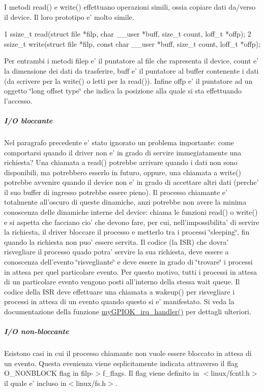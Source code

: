 I metodi read() e write() effettuano operazioni simili, ossia copiare dati da/verso il device. Il loro prototipo e' molto simile. 
\begin{DoxyCode}
1 ssize\_t read(struct file *filp, char \_\_user *buff, size\_t count, loff\_t *offp);
2 ssize\_t write(struct file *filp, const char \_\_user *buff, size\_t count, loff\_t *offp);
\end{DoxyCode}
 Per entrambi i metodi filep e' il puntatore al file che rapresenta il device, count e' la dimensione dei dati da trasferire, buff e' il puntatore al buffer contenente i dati (da scrivere per la write() o letti per la read()). Infine offp e' il puntatore ad un oggetto \char`\"{}long offset type\char`\"{} che indica la posizione alla quale si sta effettuando l'accesso.

\subparagraph*{I/\+O bloccante}

Nel paragrafo precedente e' stato ignorato un problema importante\+: come comportarsi quando il driver non e' in grado di servire immegiatamente una richiesta? Una chiamata a read() potrebbe arrivare quando i dati non sono disponibili, ma potrebbero esserlo in futuro, oppure, una chiamata a write() potrebbe avvenire quando il device non e' in grado di accettare altri dati (perche' il suo buffer di ingresso potrebbe essere pieno). Il processo chiamante e' totalmente all'oscuro di queste dinamiche, anzi potrebbe non avere la minima conoscenza delle dinamiche interne del device\+: chiama le funzioni read() o write() e si aspetta che facciano cio' che devono fare, per cui, nell'impossibilita' di servire la richiesta, il driver bloccare il processo e metterlo tra i processi \char`\"{}sleeping\char`\"{}, fin quando la richiesta non puo' essere servita. Il codice (la I\+S\+R) che dovra' risvegliare il processo quado potra' servire la sua richiesta, deve essere a conoscenza dell'evento \char`\"{}risvegliante\char`\"{} e deve essere in grado di \char`\"{}trovare\char`\"{} i processi in attesa per quel particolare evento. Per questo motivo, tutti i processi in attesa di un particolare evento vengono posti all'interno della stessa wait queue. Il codice della I\+S\+R deve effettuare una chiamata a wakeup() per risvegliare i processi in attesa di un evento quando questo si e' manifestato. Si veda la documentazione della funzione \hyperlink{group___kernel-_module_ga2fc230a12a97aa63e43b2dc4aec73511}{my\+G\+P\+I\+O\+K\+\_\+irq\+\_\+handler()} per dettagli ulteriori. \subparagraph*{I/\+O non-\/bloccante}

Esistono casi in cui il processo chiamante non vuole essere bloccato in attesa di un evento. Questa evenienza viene esplicitamente indicata attraverso il flag O\+\_\+\+N\+O\+N\+B\+L\+O\+C\+K flag in filp-\/$>$f\+\_\+flags. Il flag viene definito in $<$linux/fcntl.\+h$>$ il quale e' incluso in$<$linux/fs.\+h$>$.

